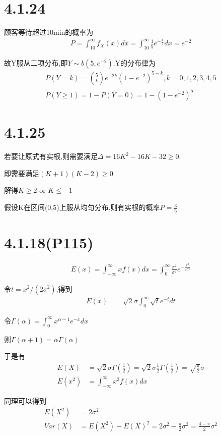 \documentclass[12pt,a4paper,fontset=none]{ctexart}
\begin{document}
\section*{4.1.24}
顾客等待超过10min的概率为
\begin{align*}
    P=\int_{10}^{\infty}f_X(x)dx=\int_{10}^{\infty}\frac{1}{5}e^{-\frac{x}{5} } dx=e^{-2}
\end{align*}

故Y服从二项分布,即$Y\sim b(5,e^{-2})$.Y的分布律为
\begin{align*}
    P(Y=k)=\binom{5}{k} e^{-2k}(1-e^{-2})^{5-k},k=0,1,2,3,4,5 \\
    P(Y\geqslant 1)=1-P(Y=0)=1-(1-e^{-2})^5
\end{align*}
\section*{4.1.25}
若要让原式有实根,则需要满足$\Delta=16K^2-16K-32\geqslant 0$.

即需要满足$(K+1)(K-2)\geqslant 0$

解得$K\geqslant 2 $ or $ K\leqslant -1$

假设K在区间(0,5)上服从均匀分布,则有实根的概率$P=\frac{3}{5} $
\section*{4.1.18(P115)}
\begin{align*}
    E(x)=\int_{-\infty}^{\infty}xf(x)dx=\int_{0}^{\infty}\frac{x^2}{\sigma^2}e^{-\frac{x^2}{2\sigma^2} }
\end{align*}

令$t=x^2/(2\sigma^2)$,得到
\begin{align*}
    E(x) & =\sqrt2\sigma\int_{0}^{\infty}\sqrt te^{-t}dt
\end{align*}

令$\Gamma(\alpha)=\int_0^{\infty}x^{\alpha-1}e^{-x}dx$

则$\Gamma(\alpha+1)=\alpha\Gamma(\alpha)$

于是有
\begin{align*}
    E(X)   & =\sqrt 2\sigma\Gamma(\frac{1}{2} )=\sqrt 2\sigma\frac{1}{2} \Gamma(\frac{1}{2} )=\sqrt{\frac{\pi}{2} }\sigma \\
    E(x^2) & =\int_{-\infty}^{\infty}x^{2}f(x)dx
\end{align*}

同理可以得到
\begin{align*}
    E(X^2) & =2\sigma^2                                                             \\
    Var(X) & =E(X^2)-E(X)^2=2\sigma^2-\frac{\pi}{2}\sigma^2=\frac{4-\pi}{2}\sigma^2
\end{align*}
\end{document}
